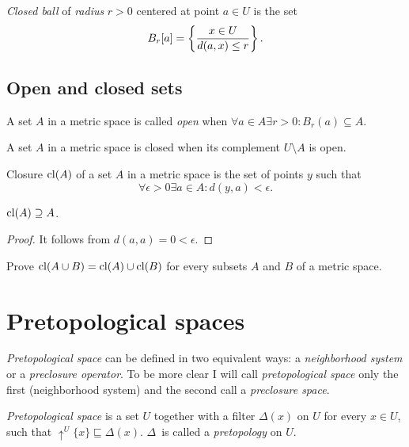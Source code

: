\begin{defn}
\emph{Closed ball} of \emph{radius} $r>0$ centered
at point $a\in U$ is the set
\[
B_{r}[a]=\left\{ \frac{x\in U}{d(a,x)\le r}\right\}.
\]

\end{defn}

\subsection{Open and closed sets}
\begin{defn}
A set $A$ in a metric space is called
\emph{open} when $\forall a\in A\exists r>0:B_{r}(a)\subseteq A$.
\end{defn}

\begin{defn}
A set $A$ in a metric space is
closed when its complement $U\setminus A$ is open.
\end{defn}

\begin{defn}
Closure $\operatorname{cl}(A)$ of a set $A$ in
a metric space is the set of points $y$ such that
\[
\forall\epsilon>0\exists a\in A:d(y,a)<\epsilon.
\]
\end{defn}
\begin{prop}
$\operatorname{cl}(A)\supseteq A$.\end{prop}
\begin{proof}
It follows from $d(a,a)=0<\epsilon$.\end{proof}
\begin{xca}
Prove $\operatorname{cl}(A\cup B)=\operatorname{cl}(A)\cup\operatorname{cl}(B)$ for every subsets $A$ and
$B$ of a metric space.
\end{xca}

\section{Pretopological spaces}

\emph{Pretopological space} can be defined in two equivalent ways:
a \emph{neighborhood system} or a \emph{preclosure operator}. To be
more clear I will call \emph{pretopological space} only the first
(neighborhood system) and the second call a \emph{preclosure space}.
\begin{defn}
\emph{Pretopological
space} is a set $U$ together with a filter $\Delta(x)$ on \emph{$U$}
for every $x\in U$, such that $\uparrow^{U}\{x\}\sqsubseteq\Delta(x)$.
$\Delta$~is called a \emph{pretopology} on $U$.
\end{defn}

